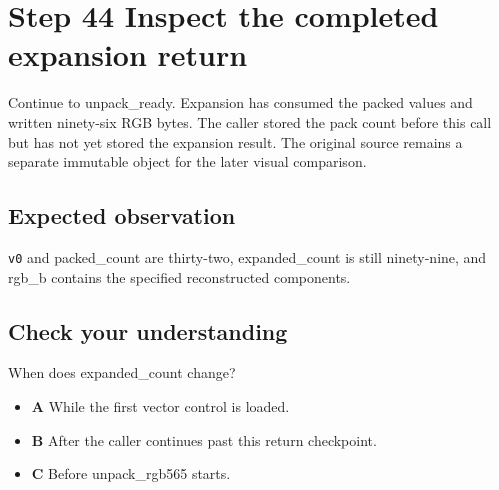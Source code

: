 \section{Step 44 Inspect the completed expansion return}\label{rgb-s44}

Continue to unpack\_ready. Expansion has consumed the packed values and written ninety-six RGB bytes. The caller stored the pack count before this call but has not yet stored the expansion result. The original source remains a separate immutable object for the later visual comparison.

\subsection{Expected observation}
\texttt{v0} and packed\_count are thirty-two, expanded\_count is still ninety-nine, and rgb\_b contains the specified reconstructed components.

\subsection{Check your understanding}
When does expanded\_count change?

\begin{itemize}
  \item \textbf{A} While the first vector control is loaded.
  \item \textbf{B} After the caller continues past this return checkpoint.
  \item \textbf{C} Before unpack\_rgb565 starts.
\end{itemize}
